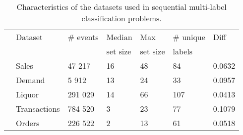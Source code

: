 \documentclass[runningheads]{llncs}
\begin{document}

\begin{table}[t!]
\centering
\begin{tabular}{p{0.3cm}p{2.2cm}p{1.7cm}p{1.6cm}p{1.6cm}p{1.8cm}p{1.1cm}}
\hline
& Dataset & \# events & Median & Max & \# unique & Diff \\
& &  & set size & set size &  labels \\
\hline
& Sales & 47 217 & 16 & 48  & 84 & 0.0632 \\
& Demand & 5 912 & 13 & 24  & 33 & 0.0957 \\
& Liquor & 291 029 & 14 & 66 & 107 & 0.0413 \\
& Transactions & 784 520 & 3 & 23  & 77 & 0.1079 \\
& Orders & 226 522 & 2 & 13 & 61 & 0.0518 \\
\hline
\end{tabular}
\caption{Characteristics of the datasets used in sequential multi-label classification problems.}
\label{tab:multi_datasets}
\end{table}
\end{document}
